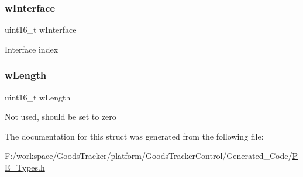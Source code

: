 \subsubsection{\texorpdfstring{w\+Interface}{wInterface}}
{\footnotesize\ttfamily uint16\+\_\+t w\+Interface}

Interface index \mbox{\label{struct_l_d_d___u_s_b___t_set_interface_request___struct_a496c03443b177fd2e6c93616064d2934}} 
\subsubsection{\texorpdfstring{w\+Length}{wLength}}
{\footnotesize\ttfamily uint16\+\_\+t w\+Length}

Not used, should be set to zero 

The documentation for this struct was generated from the following file\+:\begin{DoxyCompactItemize}
\item 
F\+:/workspace/\+Goods\+Tracker/platform/\+Goods\+Tracker\+Control/\+Generated\+\_\+\+Code/\hyperlink{_p_e___types_8h}{P\+E\+\_\+\+Types.\+h}\end{DoxyCompactItemize}
